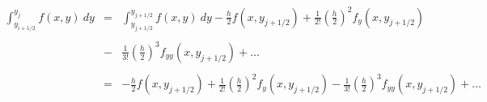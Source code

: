 \documentclass{article}
\begin{document}
\[
\begin{array}{rcl}
    \displaystyle
    \int_{y_{i+1/2}}^{y_{j}}
    f(x, y) \: dy	&=&	\displaystyle
                        \int_{y_{j+1/2}}^{y_{j+1/2}}
                        f(x, y) \: dy
                        -
                        \frac{h}{2}
                        f(x, y_{j+1/2})
                        +
                        \frac{1}{2!}
                        \left(
                        \frac{h}{2}
                        \right)^2
                        f_y(x, y_{j+1/2})
                        \\
                    & &	\\
                    &-&	\displaystyle
                        \frac{1}{3!}
                        \left(
                        \frac{h}{2}
                        \right)^3
                        f_{yy}(x, y_{j+1/2})
                        + \ldots
                        \\
                    & &	\\
                    &=&	\displaystyle
                        -\frac{h}{2}
                        f(x, y_{j+1/2})
                        +
                        \frac{1}{2!}
                        \left(
                        \frac{h}{2}
                        \right)^2
                        f_y(x, y_{j+1/2})
                        -
                        \frac{1}{3!}
                        \left(
                        \frac{h}{2}
                        \right)^3
                        f_{yy}(x, y_{j+1/2})
                        +
                        \ldots
                        \\
\end{array}
\]
\end{document}
